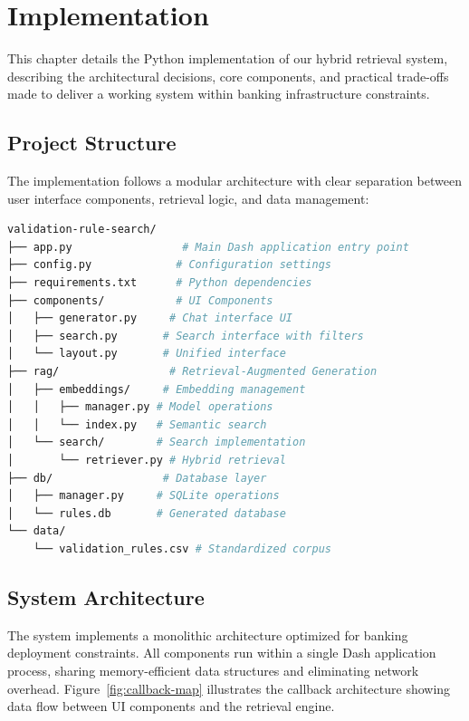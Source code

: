 \chapter{Implementation}
\label{ch:implementation}

This chapter details the Python implementation of our hybrid retrieval system, describing the architectural decisions, core components, and practical trade-offs made to deliver a working system within banking infrastructure constraints.

\section{Project Structure}

The implementation follows a modular architecture with clear separation between user interface components, retrieval logic, and data management:

\begin{lstlisting}[language=bash, caption={Project directory structure}, label={lst:project-structure}]
validation-rule-search/
├── app.py                 # Main Dash application entry point
├── config.py             # Configuration settings
├── requirements.txt      # Python dependencies
├── components/           # UI Components
│   ├── generator.py     # Chat interface UI
│   ├── search.py       # Search interface with filters
│   └── layout.py       # Unified interface
├── rag/                 # Retrieval-Augmented Generation
│   ├── embeddings/     # Embedding management
│   │   ├── manager.py # Model operations
│   │   └── index.py   # Semantic search
│   └── search/        # Search implementation
│       └── retriever.py # Hybrid retrieval
├── db/                 # Database layer
│   ├── manager.py     # SQLite operations
│   └── rules.db       # Generated database
└── data/
    └── validation_rules.csv # Standardized corpus
\end{lstlisting}

\section{System Architecture}

The system implements a monolithic architecture optimized for banking deployment constraints. All components run within a single Dash application process, sharing memory-efficient data structures and eliminating network overhead. Figure~\ref{fig:callback-map} illustrates the callback architecture showing data flow between UI components and the retrieval engine.

